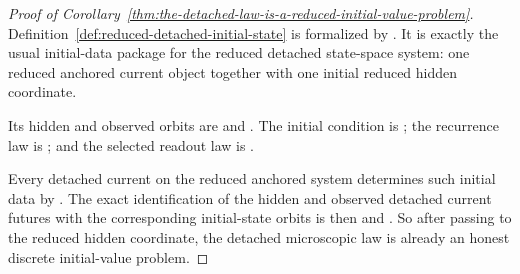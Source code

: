 \begin{proof}[Proof of Corollary~\ref{thm:the-detached-law-is-a-reduced-initial-value-problem}]
\label{proof:thm:the-detached-law-is-a-reduced-initial-value-problem}
Definition~\ref{def:reduced-detached-initial-state} is formalized by
. It is exactly the usual initial-data
package for the reduced detached state-space system: one reduced anchored
current object together with one initial reduced hidden coordinate.

Its hidden and observed orbits are
and
. The initial
condition is
; the recurrence
law is
; and the
selected readout law is
.

Every detached current on the reduced anchored system determines such initial
data by
. The exact
identification of the hidden and observed detached current futures with the
corresponding initial-state orbits is then
and
.
So after passing to the reduced hidden coordinate, the detached microscopic law
is already an honest discrete initial-value problem.
\end{proof}

